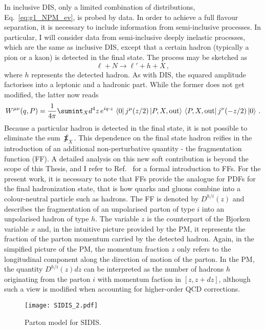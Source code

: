 In inclusive DIS, only a limited combination of distributions, Eq.~\eqref{eq:g1_NPM_ev}, is probed by data. In order to achieve a full flavour separation, it is necessary to include information from semi-inclusive processes. In particular, I will consider data from semi-inclusive deeply inelastic processes, which are the same as inclusive DIS, except that a certain hadron (typically a pion or a kaon) is detected in the final state. The process may be sketched as
\begin{equation}
  \ell + N \longrightarrow \ell' + h +  X \,,
    \label{eq:SIDIS}
\end{equation}
where $h$ represents the detected hadron. As with DIS, the squared amplitude factorises into a leptonic and a hadronic part. While the former does not get modified, the latter now reads \cite{collins_2011}
\begin{equation}
  W^{\mu \nu} (q,P) = \frac{1}{4\pi} \sumint_{X} d^4 z \, e^{i q \cdot z} \, \bra{0} j^{\mu}(z/2) \ket{P,X,\T{out}} \, \bra{P,X,\T{out}} j^{\nu}(-z/2) \ket{0}\,.
\end{equation}
Because a particular hadron is detected in the final state, it is not possible to eliminate the sum $\sumint_{X}$. This dependence on the final state hadron reifies in the introduction of an additional non-perturbative quantity - the fragmentation function (FF). A detailed analysis on this new soft contribution is beyond the scope of this Thesis, and I refer to Ref.~\cite{Metz:2016swz} for a formal introduction to FFs. For the present work, it is necessary to note that FFs provide the analogue for PDFs for the final hadronization state, that is how quarks and gluons combine into a colour-neutral particle such as hadrons. The FF is denoted by $D^{h/i}(z)$ and describes the fragmentation of an unpolarised parton of type $i$ into an unpolarised hadron of type $h$. The variable $z$ is the counterpart of the Bjorken variable $x$ and, in the intuitive picture provided by the PM, it represents the fraction of the parton momentum carried by the detected hadron. Again, in the simpified picture of the PM, the momentum fraction $z$ only refers to the longitudinal component along the direction of motion of the parton. In the PM, the quantity $D^{h/i}(z)dz$ can be interpreted as the number of hadrons $h$ originating from the parton $i$ with momentum faction in $[z, z+dz]$, although such a view is modified when accounting for higher-order QCD corrections.%

\begin{figure}[t]
  \centering
  \texttt{[image: SIDIS\_2.pdf]} 
  \caption{Parton model for SIDIS.}
  \label{fig:SIDIS_PM}
\end{figure}

